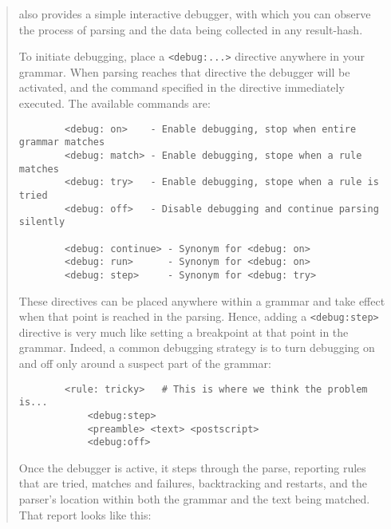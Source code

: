 \begin{it}
\begin{quotation}

 also provides a simple interactive debugger, with which
you can observe the process of parsing and the data being collected in
any result-hash.

To initiate debugging, place a \verb"<debug:...>" directive anywhere in your
grammar. When parsing reaches that directive the debugger will be
activated, and the command specified in the directive immediately
executed. The available commands are:

\begin{verbatim}
        <debug: on>    - Enable debugging, stop when entire grammar matches
        <debug: match> - Enable debugging, stope when a rule matches
        <debug: try>   - Enable debugging, stope when a rule is tried
        <debug: off>   - Disable debugging and continue parsing silently

        <debug: continue> - Synonym for <debug: on>
        <debug: run>      - Synonym for <debug: on>
        <debug: step>     - Synonym for <debug: try>
\end{verbatim}

    These directives can be placed anywhere within a grammar and take effect
    when that point is reached in the parsing. Hence, adding a
    \verb"<debug:step>" directive is very much like setting a breakpoint at that
    point in the grammar. Indeed, a common debugging strategy is to turn
    debugging on and off only around a suspect part of the grammar:

\begin{verbatim}
        <rule: tricky>   # This is where we think the problem is...
            <debug:step>
            <preamble> <text> <postscript>
            <debug:off>
\end{verbatim}

Once the debugger is active, it steps through the parse, reporting rules
that are tried, matches and failures, backtracking and restarts, and the
parser's location within both the grammar and the text being matched.
That report looks like this:


\end{quotation}
\end{it}
